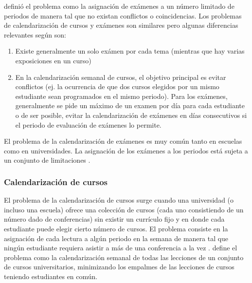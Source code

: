 \documentclass[draft,12pt,headsepline,footsepline,paper=letter]{scrreprt}
\begin{document}
\citet[p.~4]{carter95recent-developments} definió el problema como la asignación de exámenes a un número limitado de periodos de manera tal que no existan conflictos o coincidencias. Los problemas de calendarización de cursos y exámenes son similares pero algunas diferencias relevantes según \citet[p.~159]{werra85an-introduction-to-timetabling} son:
\begin{enumerate}[a]
\item Existe generalmente un solo exámen por cada tema (mientras que hay varias exposiciones en un curso)
\item En la calendarización semanal de cursos, el objetivo principal es evitar conflictos (ej. la ocurrencia de que dos cursos elegidos por un mismo estudiante sean programados en el mismo periodo). Para los exámenes, generalmente se pide un máximo de un examen por día para cada estudiante o de ser posible, evitar la calendarización de exámenes en días consecutivos si el periodo de evaluación de exámenes lo permite.
\end{enumerate}
El problema de la calendarización de exámenes es muy común tanto en escuelas como en universidades. La asignación de los exámenes a los periodos está sujeta a un conjunto de limitaciones \citep[p.~12]{abdullah06heuristic-approaches}.

\subsubsection{Calendarización de cursos}

El problema de la calendarización de cursos surge cuando una universidad (o incluso una escuela) ofrece una colección de cursos (cada uno consistiendo de un número dado de conferencias) sin existir un currículo fijo y en donde cada estudiante puede elegir cierto número de cursos. El problema consiste en la asignación de cada lectura a algún periodo en la semana de manera tal que ningún estudiante requiera asistir a más de una conferencia a la vez \citep[p.~157]{werra85an-introduction-to-timetabling}. 
\citet[p.~88]{schaerf99a-survey-of-automated} define el problema como la calendarización semanal de todas las lecciones de un conjunto de cursos universitarios, minimizando los empalmes de las lecciones de cursos teniendo estudiantes en común.






{
\RaggedRight
\printindex
}
\end{document}
